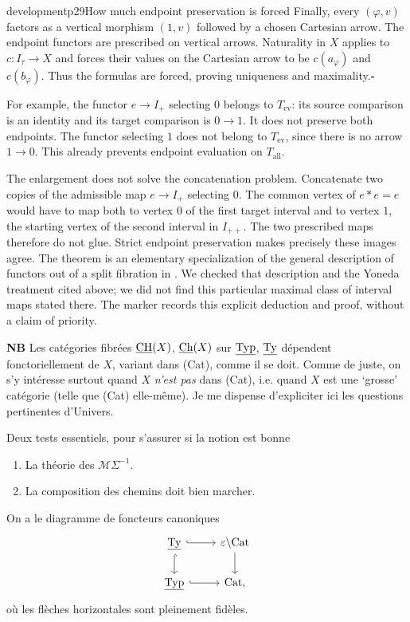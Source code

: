 \begin{dcomment}{development}{p29}{How much endpoint preservation is forced}
Finally, every $(\varphi,v)$ factors as a vertical morphism $(1,v)$ followed by a chosen Cartesian arrow. The endpoint functors are prescribed on vertical arrows. Naturality in $X$ applies to $c:I_\tau\to X$ and forces their values on the Cartesian arrow to be $c(a_\varphi)$ and $c(b_\varphi)$. Thus the formulas are forced, proving uniqueness and maximality.\hfill$\square$

For example, the functor $e\to I_+$ selecting $0$ belongs to $T_{\mathrm{ev}}$: its source comparison is an identity and its target comparison is $0\to1$. It does not preserve both endpoints. The functor selecting $1$ does not belong to $T_{\mathrm{ev}}$, since there is no arrow $1\to0$. This already prevents endpoint evaluation on $T_{\mathrm{all}}$.

The enlargement does not solve the concatenation problem. Concatenate two copies of the admissible map $e\to I_+$ selecting $0$. The common vertex of $e*e=e$ would have to map both to vertex $0$ of the first target interval and to vertex $1$, the starting vertex of the second interval in $I_{++}$. The two prescribed maps therefore do not glue. Strict endpoint preservation makes precisely these images agree. The theorem is an elementary specialization of the general description of functors out of a split fibration in \citet[Expos\'e~VI, Proposition~12.1]{GrothendieckSGA1}. We checked that description and the Yoneda treatment cited above; we did not find this particular maximal class of interval maps stated there. The marker records this explicit deduction and proof, without a claim of priority.
\end{dcomment}


\textbf{NB} Les catégories fibrées $\underline{\mathrm{CH}}(X)$, $\underline{\mathrm{Ch}}(X)$ sur $\underline{\mathrm{Typ}}$, $\underline{\mathrm{Ty}}$ dépendent fonctoriellement de $X$, variant dans (Cat), comme il se doit. Comme de juste, on s'y intéresse surtout quand $X$ \textit{n'est pas} dans (Cat), i.e. quand $X$ est une `grosse' catégorie (telle que (Cat) elle-même). Je me dispense d'expliciter ici les questions pertinentes d'Univers.

Deux tests essentiels, pour s'assurer si la notion est bonne
\begin{enumerate}
\item[a)] La théorie des $\mathcal{M}\Sigma^{-1}$.
\item[b)] La composition des chemins doit bien marcher.
\end{enumerate}

On a le diagramme de foncteurs canoniques
\[
\begin{tikzcd}
\ul{Ty} \arrow[r, hook] \arrow[d, hook] & \varepsilon\backslash\mathrm{Cat} \arrow[d] \\
\ul{Typ} \arrow[r, hook] & \mathrm{Cat},
\end{tikzcd}
\]
où les flèches horizontales sont pleinement fidèles.

